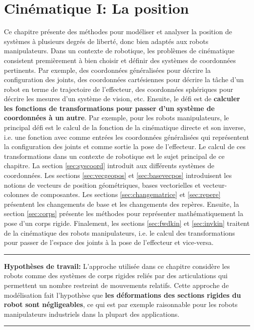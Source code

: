 \chapter{Cinématique I: La position}
\label{sec:cine1}

Ce chapitre présente des méthodes pour modéliser et analyser la position de systèmes à plusieurs degrés de liberté, donc bien adaptés aux robots manipulateurs. Dans un contexte de robotique, les problèmes de cinématique consistent premièrement à bien choisir et définir des systèmes de coordonnées pertinents. Par exemple, des coordonnées généralisées pour décrire la configuration des joints, des coordonnées cartésiennes pour décrire la tâche d'un robot en terme de trajectoire de l'effecteur, des coordonnées sphériques pour décrire les mesures d'un système de vision, etc. Ensuite, le défi est de \textbf{calculer les fonctions de transformations pour passer d'un système de coordonnées à un autre}. Par exemple, pour les robots manipulateurs, le principal défi est le calcul de la fonction de la cinématique directe et son inverse, i.e. une fonction avec comme entrées les coordonnées généralisées qui représentent la configuration des joints et comme sortie la pose de l'effecteur. Le calcul de ces transformations dans un contexte de robotique est le sujet principal de ce chapitre. La section \ref{sec:syscoord} introduit aux différents systèmes de coordonnées. Les sections \ref{sec:vecgeopos} et \ref{sec:basevecpos} introduisent les notions de vecteurs de position géométriques, bases vectorielles et vecteur-colonnes de composantes. Les sections \ref{sec:changematrice} et \ref{sec:repere} présentent les changements de base et les changements des repères. Ensuite, la section \ref{sec:corps} présente les méthodes pour représenter mathématiquement la pose d'un corps rigide. Finalement, les sections \ref{sec:fwdkin} et \ref{sec:invkin} traitent de la cinématique des robots manipulateurs, i.e. le calcul des transformations pour passer de l'espace des joints à la pose de l'effecteur et vice-versa. 

\noindent
\rule{\linewidth}{0.3mm}
\textbf{Hypothèses de travail:} L'approche utilisée dans ce chapitre considère les robots comme des systèmes de corps rigides reliés par des articulations qui permettent un nombre restreint de mouvements relatifs. Cette approche de modélisation fait l'hypothèse que \textbf{les déformations des sections rigides du robot sont négligeables}, ce qui est par exemple raisonnable pour les robots manipulateurs industriels dans la plupart des applications.
\\
\rule{\linewidth}{0.3mm}



